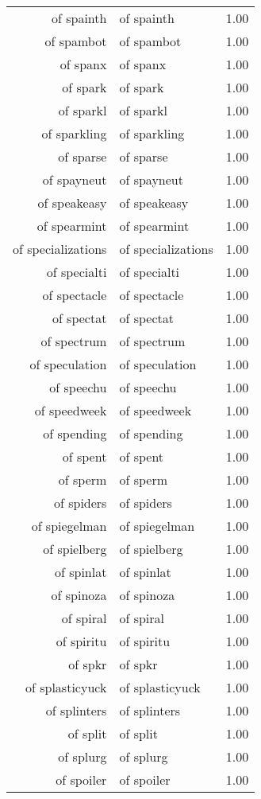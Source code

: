 \begin{table}[ht]
\begin{tabular}{rlr}
  of spainth & of spainth & 1.00 \\ 
  of spambot & of spambot & 1.00 \\ 
  of spanx & of spanx & 1.00 \\ 
  of spark & of spark & 1.00 \\ 
  of sparkl & of sparkl & 1.00 \\ 
  of sparkling & of sparkling & 1.00 \\ 
  of sparse & of sparse & 1.00 \\ 
  of spayneut & of spayneut & 1.00 \\ 
  of speakeasy & of speakeasy & 1.00 \\ 
  of spearmint & of spearmint & 1.00 \\ 
  of specializations & of specializations & 1.00 \\ 
  of specialti & of specialti & 1.00 \\ 
  of spectacle & of spectacle & 1.00 \\ 
  of spectat & of spectat & 1.00 \\ 
  of spectrum & of spectrum & 1.00 \\ 
  of speculation & of speculation & 1.00 \\ 
  of speechu & of speechu & 1.00 \\ 
  of speedweek & of speedweek & 1.00 \\ 
  of spending & of spending & 1.00 \\ 
  of spent & of spent & 1.00 \\ 
  of sperm & of sperm & 1.00 \\ 
  of spiders & of spiders & 1.00 \\ 
  of spiegelman & of spiegelman & 1.00 \\ 
  of spielberg & of spielberg & 1.00 \\ 
  of spinlat & of spinlat & 1.00 \\ 
  of spinoza & of spinoza & 1.00 \\ 
  of spiral & of spiral & 1.00 \\ 
  of spiritu & of spiritu & 1.00 \\ 
  of spkr & of spkr & 1.00 \\ 
  of splasticyuck & of splasticyuck & 1.00 \\ 
  of splinters & of splinters & 1.00 \\ 
  of split & of split & 1.00 \\ 
  of splurg & of splurg & 1.00 \\ 
  of spoiler & of spoiler & 1.00 \\ 

\end{tabular}
\end{table}
